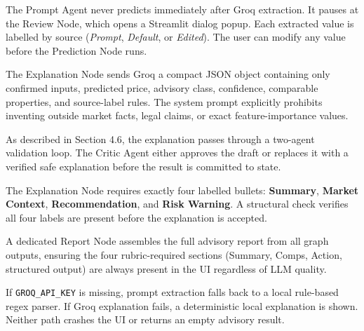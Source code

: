\documentclass[12pt,a4paper]{article}
\begin{document}
\begin{guardrailbox}[title=Guardrail 2 \textemdash{} Human Review Before Prediction]
The Prompt Agent never predicts immediately after Groq extraction. It pauses at the Review Node, which opens a Streamlit dialog popup. Each extracted value is labelled by source (\textit{Prompt}, \textit{Default}, or \textit{Edited}). The user can modify any value before the Prediction Node runs.
\end{guardrailbox}

\begin{guardrailbox}[title=Guardrail 3 \textemdash{} Grounded Explanation Prompt]
The Explanation Node sends Groq a compact JSON object containing only confirmed inputs, predicted price, advisory class, confidence, comparable properties, and source-label rules. The system prompt explicitly prohibits inventing outside market facts, legal claims, or exact feature-importance values.
\end{guardrailbox}

\begin{guardrailbox}[title=Guardrail 4 \textemdash{} Generator--Critic Cross-Validation]
As described in Section 4.6, the explanation passes through a two-agent validation loop. The Critic Agent either approves the draft or replaces it with a verified safe explanation before the result is committed to state.
\end{guardrailbox}

\begin{guardrailbox}[title=Guardrail 5 \textemdash{} Output Format Constraint]
The Explanation Node requires exactly four labelled bullets: \textbf{Summary}, \textbf{Market Context}, \textbf{Recommendation}, and \textbf{Risk Warning}. A structural check verifies all four labels are present before the explanation is accepted.
\end{guardrailbox}

\begin{guardrailbox}[title=Guardrail 6 \textemdash{} Structured Report Node]
A dedicated Report Node assembles the full advisory report from all graph outputs, ensuring the four rubric-required sections (Summary, Comps, Action, structured output) are always present in the UI regardless of LLM quality.
\end{guardrailbox}

\begin{guardrailbox}[title=Guardrail 7 \textemdash{} Safe Fallbacks]
If \texttt{GROQ\_API\_KEY} is missing, prompt extraction falls back to a local rule-based regex parser. If Groq explanation fails, a deterministic local explanation is shown. Neither path crashes the UI or returns an empty advisory result.
\end{guardrailbox}
\end{document}
